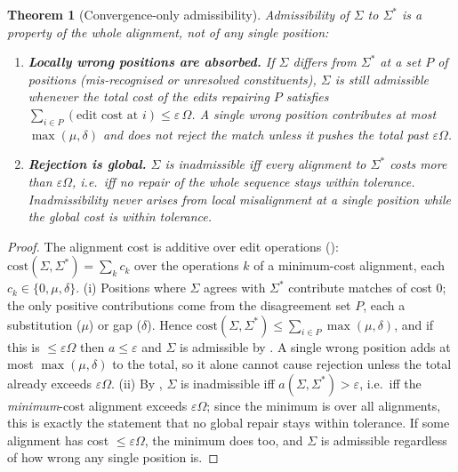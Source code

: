 \documentclass[11pt,twocolumn,a4paper]{article}
\theoremstyle{thmstyle}
\newtheorem{theorem}{Theorem}[section]
\theoremstyle{definition}
\theoremstyle{remark}
\newcommand{\sig}{\Sigma}
\newcommand{\algn}{a}
\newcommand{\Om}{\Omega}
\newcommand{\eps}{\varepsilon}
\begin{document}
\begin{theorem}[Convergence-only admissibility]
\label{thm:admissibility}
Admissibility of $\sig$ to $\sig^{\ast}$ is a property of the whole alignment,
not of any single position:
\begin{enumerate}[label=\textup{(\roman*)},leftmargin=2.2em]
\item \textbf{Locally wrong positions are absorbed.} If $\sig$ differs from
$\sig^{\ast}$ at a set $P$ of positions (mis-recognised or unresolved
constituents), $\sig$ is still admissible whenever the total cost of the edits
repairing $P$ satisfies $\sum_{i\in P}(\text{edit cost at }i)\le\eps\,\Om$. A
single wrong position contributes at most $\max(\mu,\delta)$ and does not reject
the match unless it pushes the total past $\eps\Om$.
\item \textbf{Rejection is global.} $\sig$ is inadmissible iff every alignment to
$\sig^{\ast}$ costs more than $\eps\Om$, i.e.\ iff no repair of the whole
sequence stays within tolerance. Inadmissibility never arises from local
misalignment at a single position while the global cost is within tolerance.
\end{enumerate}
\end{theorem}

\begin{proof}
The alignment cost is additive over edit operations
(): $\mathrm{cost}(\sig,\sig^{\ast})=\sum_k c_k$ over the
operations $k$ of a minimum-cost alignment, each $c_k\in\{0,\mu,\delta\}$.
(i) Positions where $\sig$ agrees with $\sig^{\ast}$ contribute matches of cost
$0$; the only positive contributions come from the disagreement set $P$, each a
substitution ($\mu$) or gap ($\delta$). Hence
$\mathrm{cost}(\sig,\sig^{\ast})\le\sum_{i\in P}\max(\mu,\delta)$, and if this is
$\le\eps\Om$ then $\algn\le\eps$ and $\sig$ is admissible by
. A single wrong position adds at most $\max(\mu,\delta)$ to
the total, so it alone cannot cause rejection unless the total already exceeds
$\eps\Om$. (ii) By , $\sig$ is inadmissible iff
$\algn(\sig,\sig^{\ast})>\eps$, i.e.\ iff the \emph{minimum}-cost alignment
exceeds $\eps\Om$; since the minimum is over all alignments, this is exactly the
statement that no global repair stays within tolerance. If some alignment has
cost $\le\eps\Om$, the minimum does too, and $\sig$ is admissible regardless of
how wrong any single position is.
\end{proof}
\end{document}
